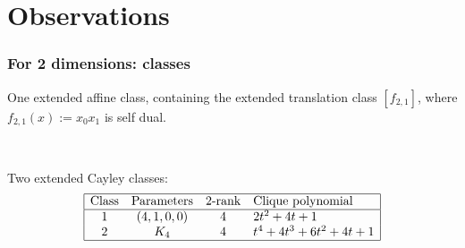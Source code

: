 \documentclass[pdf,sprung,slideColor,nocolorBG]{beamer}
\newenvironment{colortheme}[1]{
\def\ProvidesPackageRCS $##1${\relax}
\renewcommand{\ProcessOptions}{\relax}
\makeatletter

\makeatother
}{}
\begin{document}
\section{Observations}
\begin{colortheme}{jubata}
\begin{frame}
\frametitle{For 2 dimensions: classes}

One extended affine class, containing the extended translation class $[f_{2,1}]$,
where $f_{2,1}(x) := x_0 x_1$ is self dual.

~

Two extended Cayley classes:
\begin{align*}
\begin{array}{|cccl|}
\hline
\text{Class} &
\text{Parameters} &
\text{2-rank} &
\text{Clique polynomial}
\\
\hline
1 &
(4, 1, 0, 0) & 4 &
2t^{2} + 4t + 1
\\
2 &
K_4 & 4 &
t^{4} + 4t^{3} + 6t^{2} + 4t + 1
\\
\hline
\end{array}
\end{align*}


\end{frame}
\end{colortheme}
\end{document}
